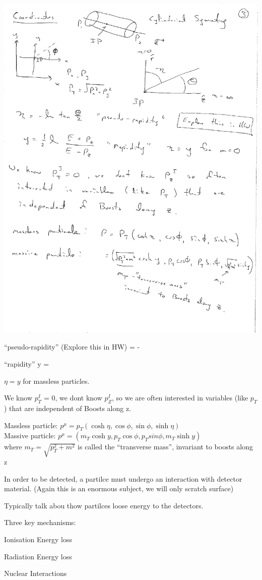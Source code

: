 {\bc
\includegraphics[width=\textwidth]{./Coordinates.pdf}
\ec

``pseudo-rapidity''  (Explore this in HW)
\be
\eta = -\ln \tan {}
\ee

``rapidity''  
\be
y  =  \ln {}
\ee

$\eta = y$ for massless particles.


We know $p_T^I$ = 0, we dont know $p_Z^I$, so we are often interested in variables (like $p_T$) that are independent of Boosts along z.


Massless particle:  $p^\mu = p_T(\cosh \eta, \cos \phi, \sin \phi, \sinh \eta)$\\

Massive particle:  $p^\mu = (m_T \cosh y, p_T \cos \phi, p_T sin \phi, m_T \sinh y)$\\
where $m_T = \sqrt{p_T^2 + m^2}$ is called the ``transverse mass'', invariant to boosts along z

\lineacross

In order to be detected, a partilce must undergo an interaction with detector material.
(Again this is an enormous subject, we will only scratch surface)


Typically talk abou thow partilces loose energy to the detectors. 

Three key mechanisms:

\bi
\item[-] Ionisation Energy loss 
\item[-] Radiation Energy loss 
\item[-] Nuclear Interactions
\ei


}



